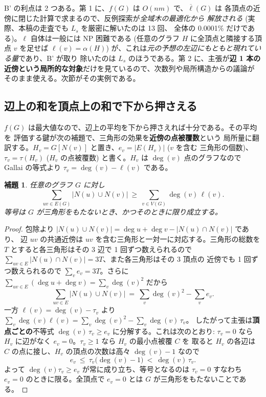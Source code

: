 \documentclass[paper=a4,fontsize=10.5pt,jafontsize=10.5pt]{jlreq}
\theoremstyle{plain}
\newtheorem{lemma}[theorem]{補題}
\theoremstyle{definition}
\begin{document}
B' の利点は 2 つある。第 1 に、$f(G)$ は $O(nm)$ で、$\overline{\ell}(G)$ は
各頂点の近傍に閉じた計算で求まるので、反例探索が\emph{全域木の最適化から
解放される} (実際、本稿の走査でも $L_s$ を厳密に解いたのは 13 回、
全体の 0.0001\% だけである)。$\ell$ 自体は一般には NP 困難である
(任意のグラフ $H$ に全頂点と隣接する頂点 $v$ を足せば $\ell(v) = \alpha(H)$)
が、これは\emph{元の予想の左辺にもともと現れている量}であり、B' が取り
除いたのは $L_s$ のほうである。第 2 に、主張が\textbf{辺 1 本の
近傍という局所的な対象}だけを見ているので、次数列や局所構造からの議論が
そのまま使える。次節がその実例である。

\subsection*{辺上の和を頂点上の和で下から押さえる}

$f(G)$ は最大値なので、辺上の平均を下から押さえれば十分である。その平均を
評価する鍵が次の補題で、三角形の効果を\textbf{近傍の点被覆数}という
局所量に翻訳する。$H_v = G[N(v)]$ と置き、$e_v = |E(H_v)|$ ($v$ を含む
三角形の個数)、$\tau_v = \tau(H_v)$ ($H_v$ の点被覆数) と書く。$H_v$ は
$\deg(v)$ 点のグラフなので Gallai の等式より
$\tau_v = \deg(v) - \ell(v)$ である。

\begin{lemma}\label{lem:sumbound}
任意のグラフ $G$ に対し
\[ \sum_{uv \in E(G)} |N(u) \cup N(v)|
   \ \ge \ \sum_{v \in V(G)} \deg(v)\,\ell(v) . \]
等号は $G$ が三角形をもたないとき、かつそのときに限り成立する。
\end{lemma}

\begin{proof}
包除より $|N(u) \cup N(v)| = \deg u + \deg v - |N(u) \cap N(v)|$ であり、
辺 $uv$ の共通近傍は $uv$ を含む三角形と一対一に対応する。三角形の総数を
$T$ とすると各三角形はその 3 辺で 1 回ずつ数えられるので
$\sum_{uv \in E} |N(u) \cap N(v)| = 3T$、また各三角形はその 3 頂点の
近傍でも 1 回ずつ数えられるので $\sum_v e_v = 3T$。さらに
$\sum_{uv \in E} (\deg u + \deg v) = \sum_v \deg(v)^2$ だから
\[ \sum_{uv \in E} |N(u) \cup N(v)|
   \ = \ \sum_v \deg(v)^2 - \sum_v e_v . \]
一方 $\ell(v) = \deg(v) - \tau_v$ より
$\sum_v \deg(v)\ell(v) = \sum_v \deg(v)^2 - \sum_v \deg(v)\,\tau_v$。
したがって主張は\textbf{頂点ごとの}不等式
$\deg(v)\,\tau_v \ge e_v$ に分解する。これは次のとおり: $\tau_v = 0$ なら
$H_v$ に辺がなく $e_v = 0$。$\tau_v \ge 1$ なら $H_v$ の最小点被覆 $C$ を
取ると $H_v$ の各辺は $C$ の点に接し、$H_v$ の頂点の次数は高々
$\deg(v) - 1$ なので
\[ e_v \ \le \ \tau_v\bigl(\deg(v) - 1\bigr)
   \ < \ \deg(v)\,\tau_v . \]
よって $\deg(v)\tau_v \ge e_v$ が常に成り立ち、等号となるのは
$\tau_v = 0$ すなわち $e_v = 0$ のときに限る。全頂点で $e_v = 0$ とは
$G$ が三角形をもたないことである。
\end{proof}
\end{document}
